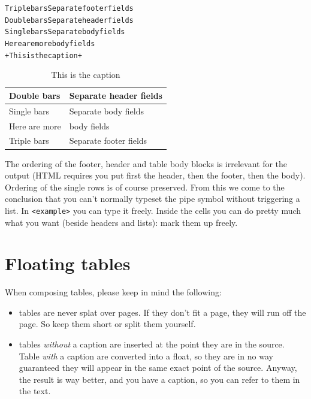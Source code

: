 \documentclass[DIV=12,%
               BCOR=0mm,%
               fontsize=10pt,%
               oneside,%
               paper=210mm:11in]{scrbook}
\begin{document}
\begin{alltt}
     Triple bars \textbar{}\textbar{}\textbar{} Separate footer fields
     Double bars  \textbar{}\textbar{} Separate header fields
     Single bars   \textbar{} Separate body fields
     Here are more \textbar{} body fields
     \textbar{}+ This is the caption +\textbar{}

\end{alltt}

\begin{table}[htbp!]
 \begin{minipage}[t]{\textwidth}
\begin{tabularx}{\textwidth}{|X|X|}
\hline
\relax      Double bars   &  Separate header fields  \\
\hline
\relax      Single bars    &  Separate body fields  \\
\relax      Here are more  &  body fields  \\
\hline
\relax      Triple bars  &  Separate footer fields  \\
\hline
\end{tabularx}

\caption[]{This is the caption}
\end{minipage}
\end{table}


The ordering of the footer, header and table body blocks is irrelevant
for the output (HTML requires you put first the header, then the
footer, then the body). Ordering of the single rows is of course
preserved. From this we come to the conclusion that you can't normally
typeset the pipe symbol without triggering a list. In \texttt{<example>} you
can type it freely. Inside the cells you can do pretty much what you
want (beside headers and lists): mark them up freely.

\section{Floating tables}


When composing tables, please keep in mind the following:


\begin{itemize}
\item\relax 
tables are never splat over pages. If they don't fit a page, they
will run off the page. So keep them short or split them yourself.



\item\relax 
tables \emph{without} a caption are inserted at the point they are in the
source. Table \emph{with} a caption are converted into a float, so they
are in no way guaranteed they will appear in the same exact point
of the source. Anyway, the result is way better, and you have a
caption, so you can refer to them in the text.




\end{itemize}
\end{document}
